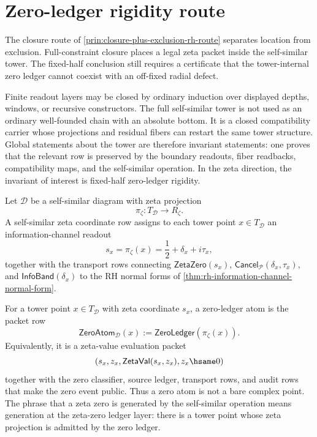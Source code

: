 \section{Zero-ledger rigidity route}
\label{sec:zero-ledger-rigidity-route}

The closure route of
\autoref{prin:closure-plus-exclusion-rh-route} separates location from
exclusion.  Full-constraint closure places a legal zeta packet inside the
self-similar tower.  The fixed-half conclusion still requires a certificate
that the tower-internal zero ledger cannot coexist with an off-fixed radial
defect.

\begin{principle}
\label{prin:finite-induction-global-coinduction}
Finite readout layers may be closed by ordinary induction over displayed
depths, windows, or recursive constructors.  The full self-similar tower is
not used as an ordinary well-founded chain with an absolute bottom.  It is
a closed compatibility carrier whose projections and residual fibers can
restart the same tower structure.  Global statements about the tower are
therefore invariant statements: one proves that the relevant row is
preserved by the boundary readouts, fiber readbacks, compatibility maps,
and the self-similar operation.  In the zeta direction, the invariant of
interest is fixed-half zero-ledger rigidity.
\end{principle}

\begin{definition}
\label{def:self-similar-zeta-coordinate-row}
Let $\mathcal D$ be a self-similar diagram with zeta projection
$$
\pi_\zeta:T_{\mathcal D}\to R_\zeta.
$$
A self-similar zeta coordinate row assigns to each tower point
$x\in T_{\mathcal D}$ an information-channel readout
$$
s_x=\pi_\zeta(x)=\frac{1}{2}+\delta_x+i\tau_x,
$$
together with the transport rows connecting $\mathsf{ZetaZero}(s_x)$,
$\mathsf{Cancel}_{\mathcal P}(\delta_x,\tau_x)$, and
$\mathsf{InfoBand}(\delta_x)$ to the RH normal forms of
\autoref{thm:rh-information-channel-normal-form}.
\end{definition}

\begin{definition}
\label{def:zero-ledger-atom}
For a tower point $x\in T_{\mathcal D}$ with zeta coordinate $s_x$, a
zero-ledger atom is the packet row
$$
\mathsf{ZeroAtom}_{\mathcal D}(x)
:=
\mathsf{ZeroLedger}(\pi_\zeta(x)).
$$
Equivalently, it is a zeta-value evaluation packet
$$
(s_x,z_x,\mathsf{ZetaVal}(s_x,z_x),z_x\hsame 0)
$$
together with the zero classifier, source ledger, transport rows, and
audit rows that make the zero event public.  Thus a zero atom is not a
bare complex point.  The phrase that a zeta zero is generated by the
self-similar operation means generation at the zeta-zero ledger layer:
there is a tower point whose zeta projection is admitted by the zero
ledger.
\end{definition}

